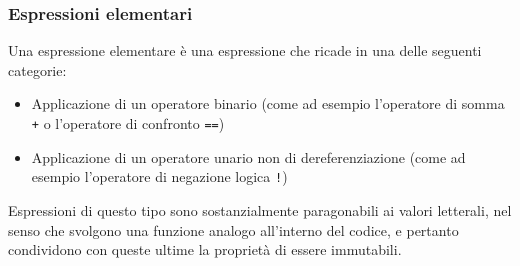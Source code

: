 \subsubsection{Espressioni elementari}
Una espressione elementare è una espressione che ricade in una delle seguenti categorie:
\begin{itemize}
    \item Applicazione di un operatore binario (come ad esempio l'operatore di somma \texttt{+} o l'operatore di confronto \texttt{==})
    \item Applicazione di un operatore unario non di dereferenziazione (come ad esempio l'operatore di negazione logica \texttt{!})
\end{itemize}
Espressioni di questo tipo sono sostanzialmente paragonabili ai valori letterali, nel senso che svolgono una funzione
analogo all'interno del codice, e pertanto condividono con queste ultime la proprietà di essere immutabili.